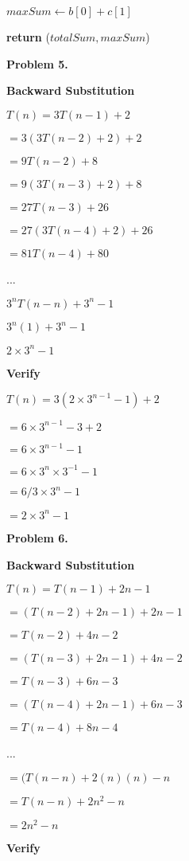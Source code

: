 \documentclass{article}
\begin{document}
\hspace{12ex}				$maxSum \leftarrow b[0] + c[1]$

\hspace{8ex}			\textbf{return} ($totalSum, maxSum$)

\newpage

	
\textbf{Problem 5.}

	\textbf{Backward Substitution}

	$T(n) = 3 T(n - 1) + 2$
	
	$ = 3 (3 T(n - 2) + 2) + 2$
	
	$ = 9 T(n - 2) + 8$
	
	$ = 9 (3 T(n - 3) + 2) + 8$
	
	$ = 27 T(n - 3) + 26$
	
	$ = 27 (3 T(n - 4) + 2) + 26$
	
	$ = 81 T(n - 4) + 80$
	
	...
	
	$3^n T(n - n) + 3^n - 1$
	
	$3^n (1) + 3^n - 1$
	
	$2 \times 3^n - 1$
	
	\textbf{Verify}
	
	$T(n) = 3 (2 \times 3^{n - 1} - 1) + 2$
	
	$ = 6 \times 3^{n - 1} - 3 + 2$
	
	$ = 6 \times 3^{n - 1} - 1$
	
	$ = 6 \times 3^n \times 3^{-1} - 1$
	
	$ = 6/3 \times 3^n - 1$
	
	$ = 2 \times 3^n - 1$
	
	
\newpage

\textbf{Problem 6.}

	\textbf{Backward Substitution}

	$T(n) = T(n - 1) + 2n - 1$
	
	$ = (T(n - 2) + 2n - 1) + 2n - 1$
	
	$ = T(n - 2) + 4n - 2$
	
	$ = (T(n - 3) + 2n - 1) + 4n - 2$
	
	$ = T(n - 3) + 6n - 3$
	
	$ = (T(n - 4) + 2n - 1) + 6n - 3$
	
	$ = T(n - 4) + 8n - 4$
	
	...
	
	$ = (T(n - n) + 2(n)(n) - n$
	
	$ = T(n - n) + 2n^2 - n$
	
	$ = 2n^2 - n$
	
	\textbf{Verify}
	
\end{document}
